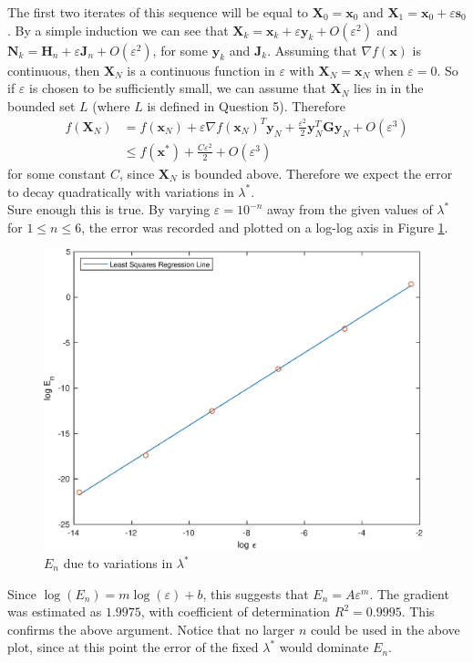 \documentclass[10pt,a4paper,notitlepage]{article}
\newcommand{\x}{\mathbf{x}}
\newcommand{\y}{\mathbf{y}}
\newcommand{\s}{\mathbf{s}}
\newcommand{\G}{\mathbf{G}}
\newcommand{\X}{\mathbf{X}}
\begin{document}
The first two iterates of this sequence will be equal to $\X_{0}=\x_{0}$ and $\X_{1}=\x_{0}+\varepsilon \s_{0}$. By a simple induction we can see that $\X_{k}=\x_{k}+\varepsilon \y_{k}+O(\varepsilon^{2})$ and $\mathbf{N}_{k}=\mathbf{H}_{n}+\varepsilon \mathbf{J}_{n}+O(\varepsilon^{2})$, for some $\y_{k}$ and $\mathbf{J}_{k}$. Assuming that $\nabla f(\x)$ is continuous, then $\X_{N}$ is a continuous function in $\varepsilon$ with $\X_{N}=\x_{N}$ when $\varepsilon =0$. So if $\varepsilon$ is chosen to be sufficiently small, we can assume that $\X_{N}$ lies in in the bounded set $L$ (where $L$ is defined in Question 5). Therefore
\begin{equation}
\begin{aligned}
f\left(\X_{N}\right) &=f\left(\x_{N}\right)+\varepsilon \nabla f\left(\x_{N}\right)^{T}\y_{N}+\frac{\varepsilon^{2}}{2}\y_{N}^{T}\G\y_{N} +O\left(\varepsilon^{3}\right)\\
&\leq f\left(\x^{*}\right)+\frac{C\varepsilon^{2}}{2}+O\left(\varepsilon^{3}\right)
\end{aligned}
\end{equation}
for some constant $C$, since $\X_{N}$ is bounded above. Therefore we expect the error to decay quadratically with variations in $\lambda^{*}$.\\

Sure enough this is true. By varying $\varepsilon=10^{-n}$ away from the given values of $\lambda^{*}$ for $1\leq n\leq 6$, the error was recorded and plotted on a log-log axis in Figure \ref{fg:6}.
\begin{figure}[H]
\centering
\includegraphics[width=11cm]{Image_Error}
\caption{$E_{n}$ due to variations in $\lambda^{*}$}\label{fg:6}
\end{figure}
Since $\log(E_{n})=m\log(\varepsilon)+b$, this suggests that $E_{n}=A\varepsilon^{m}$. The gradient was estimated as $1.9975$, with coefficient of determination $R^{2}=0.9995$. This confirms the above argument. Notice that no larger $n$ could be used in the above plot, since at this point the error of the fixed $\lambda^{*}$ would dominate $E_{n}$. 
\end{document}
